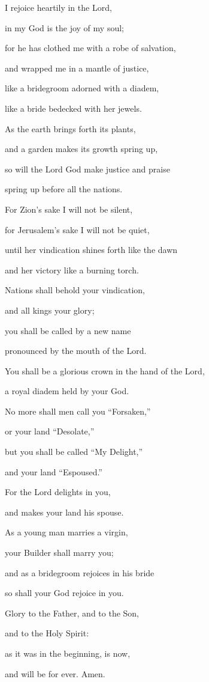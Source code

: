 \noindent I rejoice heartily in the Lord,~\GreStar{}~\nopagebreak

in my God is the joy of my soul;

\noindent for he has clothed me with a robe of salvation,~\GreStar{}~\nopagebreak

and wrapped me in a mantle of justice,

\noindent like a bridegroom adorned with a diadem,~\GreStar{}~\nopagebreak

like a bride bedecked with her jewels.

\noindent As the earth brings forth its plants,~\GreStar{}~\nopagebreak

and a garden makes its growth spring up,

\noindent so will the Lord God make justice and praise~\GreStar{}~\nopagebreak

spring up before all the nations.

\noindent For Zion’s sake I will not be silent,~\GreStar{}~\nopagebreak

for Jerusalem’s sake I will not be quiet,

\noindent until her vindication shines forth like the dawn~\GreStar{}~\nopagebreak

and her victory like a burning torch.

\noindent Nations shall behold your vindication,~\GreStar{}~\nopagebreak

and all kings your glory;

\noindent you shall be called by a new name~\GreStar{}~\nopagebreak

pronounced by the mouth of the Lord.

\noindent You shall be a glorious crown in the hand of the Lord,~\GreStar{}~\nopagebreak

a royal diadem held by your God.

\noindent No more shall men call you “Forsaken,”~\GreStar{}~\nopagebreak

or your land “Desolate,”

\noindent but you shall be called “My Delight,”~\GreStar{}~\nopagebreak

and your land “Espoused.”

\noindent For the Lord delights in you,~\GreStar{}~\nopagebreak

and makes your land his spouse.

\noindent As a young man marries a virgin,~\GreStar{}~\nopagebreak

your Builder shall marry you;

\noindent and as a bridegroom rejoices in his bride~\GreStar{}~\nopagebreak

so shall your God rejoice in you.

\noindent Glory to the Father, and to the Son,~\GreStar{}~\nopagebreak

and to the Holy Spirit:

\noindent as it was in the beginning, is now,~\GreStar{}~\nopagebreak

and will be for ever. Amen.
